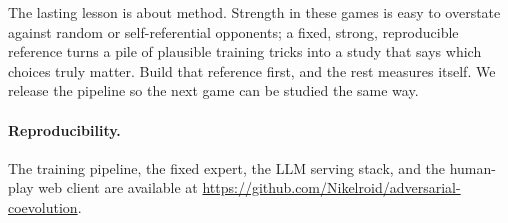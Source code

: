 \documentclass[letterpaper]{article} %
\begin{document}
The lasting lesson is about method. Strength in these games is easy to overstate
against random or self-referential opponents; a fixed, strong, reproducible
reference turns a pile of plausible training tricks into a study that says which
choices truly matter. Build that reference first, and the rest measures itself. We
release the pipeline so the next game can be studied the same way.

\paragraph{Reproducibility.}
The training pipeline, the fixed expert, the LLM serving stack, and the human-play
web client are available at
\url{https://github.com/Nikelroid/adversarial-coevolution}.
\end{document}
